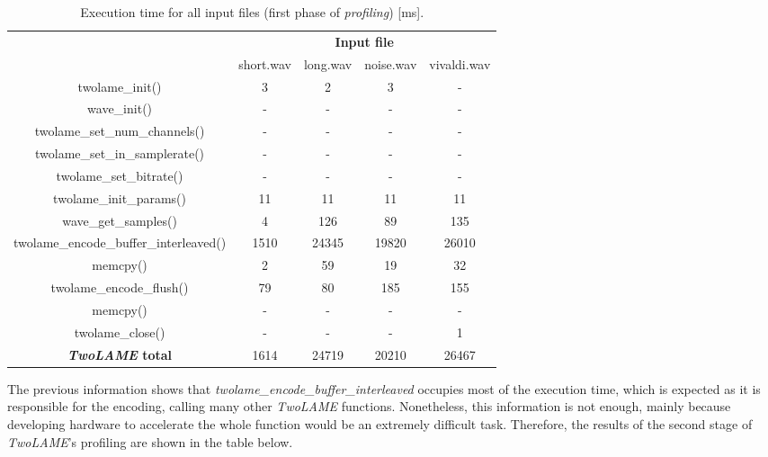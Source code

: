 \begin{table}[H]
    \centering
    \begin{tabular}{c|c|c|c|c|}
    \cline{2-5}
    \multicolumn{1}{c|}{}  & \multicolumn{4}{c|}{\textbf{Input file}} \\
    \cline{2-5}
     & short.wav & long.wav & noise.wav & vivaldi.wav \\
    \hline
    \multicolumn{1}{|c|}{twolame\_init()}  & 3 & 2 & 3 & - \\ 
    \hline
    \multicolumn{1}{|c|}{wave\_init()}  & - & - & - & - \\ 
    \hline
    \multicolumn{1}{|c|}{twolame\_set\_num\_channels()}   & - & - & - & - \\ 
    \hline
    \multicolumn{1}{|c|}{twolame\_set\_in\_samplerate()}   & - & - & - & - \\ 
    \hline
    \multicolumn{1}{|c|}{twolame\_set\_bitrate()}   & - & - & - & - \\ 
    \hline
    \multicolumn{1}{|c|}{twolame\_init\_params()}   & 11 & 11 & 11 & 11 \\ 
    \hline
    \multicolumn{1}{|c|}{wave\_get\_samples()}   & 4 & 126 & 89 & 135 \\ 
    \hline
    \multicolumn{1}{|c|}{twolame\_encode\_buffer\_interleaved()}   & 1510 & 24345 & 19820 & 26010 \\ 
    \hline
    \multicolumn{1}{|c|}{memcpy()}  & 2 & 59 & 19 & 32 \\ 
    \hline
    \multicolumn{1}{|c|}{twolame\_encode\_flush()}   & 79 & 80 & 185 & 155 \\ 
    \hline
    \multicolumn{1}{|c|}{memcpy()}  & - & - & - & - \\ 
    \hline
    \multicolumn{1}{|c|}{twolame\_close()}   & - & - & - & 1 \\ 
    \hline
    \multicolumn{1}{|c|}{\textbf{\textit{TwoLAME} total}}  & 1614 & 24719 & 20210 & 26467 \\ 
    \hline
    \end{tabular}
    \caption{Execution time for all input files (first phase of \textit{profiling}) [ms].}
    \label{profiling1}
\end{table}

The previous information shows that \textit{twolame\_encode\_buffer\_interleaved} occupies most of the execution time, which is expected as it is responsible for the encoding, calling many other \textit{TwoLAME} functions. Nonetheless, this information is not enough, mainly because developing hardware to accelerate the whole function would be an extremely difficult task.
Therefore, the results of the second stage of \textit{TwoLAME}'s profiling are shown in the table below.

